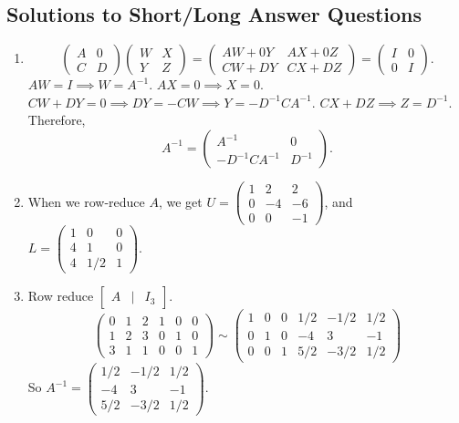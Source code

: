 \subsection{Solutions to Short/Long Answer Questions}
\begin{enumerate}
	\item[\textbf{Q1}] \[    \begin{pmatrix} A & 0 \\C & D\end{pmatrix} \begin{pmatrix}W & X \\Y & Z \end{pmatrix}
			= \begin{pmatrix} AW + 0Y & AX + 0Z \\ CW + DY & CX + DZ \end{pmatrix}
			= \begin{pmatrix} I & 0 \\ 0 & I \end{pmatrix}.\]
		\(AW = I \implies W = A^{-1}\). \(AX = 0  \implies X = 0\). \(CW + DY = 0 \implies DY = -CW \implies Y = -D^{-1}CA^{-1}.\) 
		\(CX + DZ \implies Z = D^{-1}\). Therefore, \[A^{-1} = \begin{pmatrix}A^{-1} & 0 \\ -D^{-1}CA^{-1} &  D^{-1}\end{pmatrix}.\]
	
	\item[\textbf{Q2}] When we row-reduce \(A\), we get \(U = \begin{pmatrix}1 & 2 & 2 \\ 0 & -4 & -6 \\ 0 & 0 & -1\end{pmatrix}\), and 
		\(L = \begin{pmatrix}1 & 0 & 0 \\ 4 & 1 & 0 \\ 4 & 1/2 & 1\end{pmatrix}\).
	
	\item[\textbf{Q3}] Row reduce \(\begin{bmatrix}A & | & I_3\end{bmatrix}\). 
		\[\left(\!\!\begin{array}{ccc|ccc}0 & 1 & 2 & 1 & 0 & 0 \\ 1 & 2 & 3 & 0 & 1 & 0 \\ 3 & 1 & 1 & 0 & 0 & 1\end{array}\!\!\right)
	\sim	  \left(\!\!\begin{array}{ccc|ccc}1 & 0 & 0 & 1/2 & -1/2 & 1/2 \\ 0 & 1 & 0 & -4 & 3 & -1 \\ 0 & 0 & 1 & 5/2 & -3/2 & 1/2\end{array}\!\!\right)
		\] So \(A^{-1} = \begin{pmatrix}1/2 & -1/2 & 1/2 \\ -4 & 3 & -1 \\ 5/2 & -3/2 & 1/2\end{pmatrix}\).
	

\end{enumerate}
